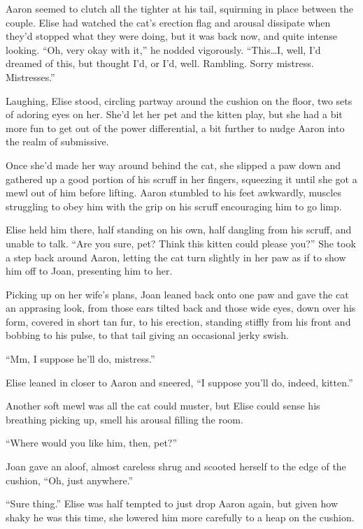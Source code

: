 \documentclass[12pt,letterpaper,oneside]{memoir}
\begin{document}
  Aaron seemed to clutch all the tighter at his tail, squirming in place between the couple. Elise had watched the cat's erection flag and arousal dissipate when they'd stopped what they were doing, but it was back now, and quite intense looking. ``Oh, very okay with it,'' he nodded vigorously. ``This\ldots{}I, well, I'd dreamed of this, but thought I'd, or I'd, well. Rambling. Sorry mistress.  Mistresses.''

  Laughing, Elise stood, circling partway around the cushion on the floor, two sets of adoring eyes on her. She'd let her pet and the kitten play, but she had a bit more fun to get out of the power differential, a bit further to nudge Aaron into the realm of submissive.

  Once she'd made her way around behind the cat, she slipped a paw down and gathered up a good portion of his scruff in her fingers, squeezing it until she got a mewl out of him before lifting. Aaron stumbled to his feet awkwardly, muscles struggling to obey him with the grip on his scruff encouraging him to go limp.

  Elise held him there, half standing on his own, half dangling from his scruff, and unable to talk. ``Are you sure, pet? Think this kitten could please you?'' She took a step back around Aaron, letting the cat turn slightly in her paw as if to show him off to Joan, presenting him to her.

  Picking up on her wife's plans, Joan leaned back onto one paw and gave the cat an apprasing look, from those ears tilted back and those wide eyes, down over his form, covered in short tan fur, to his erection, standing stiffly from his front and bobbing to his pulse, to that tail giving an occasional jerky swish.

  ``Mm, I suppose he'll do, mistress.''

  Elise leaned in closer to Aaron and sneered, ``I suppose you'll do, indeed, kitten.''

  Another soft mewl was all the cat could muster, but Elise could sense his breathing picking up, smell his arousal filling the room.

  ``Where would you like him, then, pet?''

  Joan gave an aloof, almost careless shrug and scooted herself to the edge of the cushion, ``Oh, just anywhere.''

  ``Sure thing.'' Elise was half tempted to just drop Aaron again, but given how shaky he was this time, she lowered him more carefully to a heap on the cushion.
\end{document}
